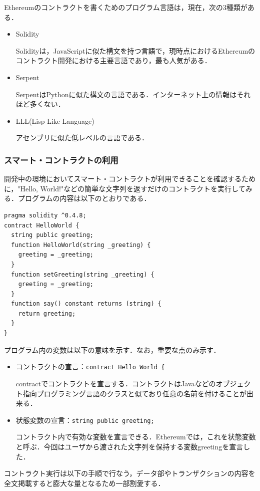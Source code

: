 Ethereumのコントラクトを書くためのプログラム言語は，現在，次の3種類がある．

\begin{itemize}
\item Solidity

Solidityは，JavaScriptに似た構文を持つ言語で，現時点におけるEthereumのコントラクト開発における主要言語であり，最も人気がある．

\item Serpent

SerpentはPythonに似た構文の言語である．インターネット上の情報はそれほど多くない．

\item LLL(Lisp Like Language)

アセンブリに似た低レベルの言語である．
\end{itemize}

\newpage

\subsubsection{スマート・コントラクトの利用}

開発中の環境においてスマート・コントラクトが利用できることを確認するために，"Hello, World!"などの簡単な文字列を返すだけのコントラクトを実行してみる．プログラムの内容は以下のとおりである．
\begin{lstlisting}[basicstyle=\ttfamily\footnotesize, frame=single]
pragma solidity ^0.4.8;
contract HelloWorld {
  string public greeting;
  function HelloWorld(string _greeting) {
    greeting = _greeting;
  }
  function setGreeting(string _greeting) {
    greeting = _greeting;
  }
  function say() constant returns (string) {
    return greeting;
  }
}
\end{lstlisting}

プログラム内の変数は以下の意味を示す．なお，重要な点のみ示す．
\begin{itemize}
\item コントラクトの宣言：\texttt{contract Hello World \{}

contractでコントラクトを宣言する．コントラクトはJavaなどのオブジェクト指向プログラミング言語のクラスと似ており任意の名前を付けることが出来る．

\item 状態変数の宣言：\texttt{string public greeting;}

コントラクト内で有効な変数を宣言できる．Ethereumでは，これを状態変数と呼ぶ．今回はユーザから渡された文字列を保持する変数greetingを宣言した．
\newpage
\end{itemize}
コントラクト実行は以下の手順で行なう，データ部やトランザクションの内容を全文掲載すると膨大な量となるため一部割愛する．

